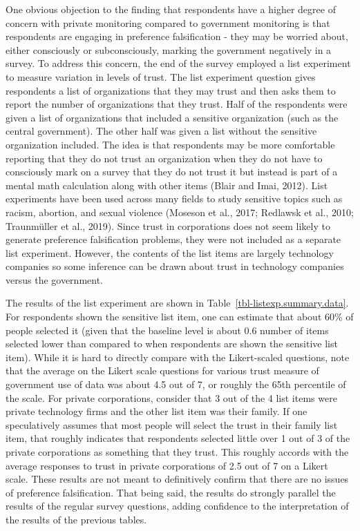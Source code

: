 \documentclass[
  letterpaper,
  DIV=11,
  numbers=noendperiod]{scrartcl}
\begin{document}
One obvious objection to the finding that respondents have a higher
degree of concern with private monitoring compared to government
monitoring is that respondents are engaging in preference falsification
- they may be worried about, either consciously or subconsciously,
marking the government negatively in a survey. To address this concern,
the end of the survey employed a list experiment to measure variation in
levels of trust. The list experiment question gives respondents a list
of organizations that they may trust and then asks them to report the
number of organizations that they trust. Half of the respondents were
given a list of organizations that included a sensitive organization
(such as the central government). The other half was given a list
without the sensitive organization included. The idea is that
respondents may be more comfortable reporting that they do not trust an
organization when they do not have to consciously mark on a survey that
they do not trust it but instead is part of a mental math calculation
along with other items (Blair and Imai, 2012). List experiments have
been used across many fields to study sensitive topics such as racism,
abortion, and sexual violence (Moseson et al., 2017; Redlawsk et al.,
2010; Traunmüller et al., 2019). Since trust in corporations does not
seem likely to generate preference falsification problems, they were not
included as a separate list experiment. However, the contents of the
list items are largely technology companies so some inference can be
drawn about trust in technology companies versus the government.

The results of the list experiment are shown in
Table~\ref{tbl-listexp.summary.data}. For respondents shown the
sensitive list item, one can estimate that about 60\% of people selected
it (given that the baseline level is about 0.6 number of items selected
lower than compared to when respondents are shown the sensitive list
item). While it is hard to directly compare with the Likert-scaled
questions, note that the average on the Likert scale questions for
various trust measure of government use of data was about 4.5 out of 7,
or roughly the 65th percentile of the scale. For private corporations,
consider that 3 out of the 4 list items were private technology firms
and the other list item was their family. If one speculatively assumes
that most people will select the trust in their family list item, that
roughly indicates that respondents selected little over 1 out of 3 of
the private corporations as something that they trust. This roughly
accords with the average responses to trust in private corporations of
2.5 out of 7 on a Likert scale. These results are not meant to
definitively confirm that there are no issues of preference
falsification. That being said, the results do strongly parallel the
results of the regular survey questions, adding confidence to the
interpretation of the results of the previous tables.
\end{document}
